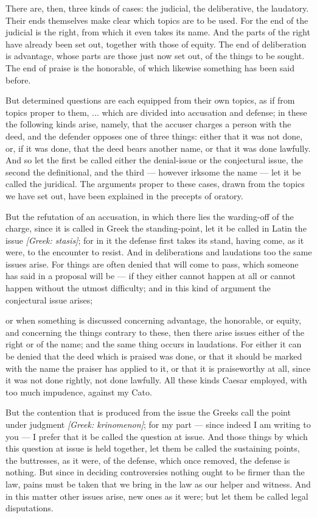  There are, then, three kinds of cases: the judicial, the deliberative, the laudatory. Their ends themselves make clear which topics are to be used. For the end of the judicial is the right, from which it even takes its name. And the parts of the right have already been set out, together with those of equity. The end of deliberation is advantage, whose parts are those just now set out, of the things to be sought. The end of praise is the honorable, of which likewise something has been said before.

 But determined questions are each equipped from their own topics, as if from topics proper to them, ... which are divided into accusation and defense; in these the following kinds arise, namely, that the accuser charges a person with the deed, and the defender opposes one of three things: either that it was not done, or, if it was done, that the deed bears another name, or that it was done lawfully. And so let the first be called either the denial-issue or the conjectural issue, the second the definitional, and the third — however irksome the name — let it be called the juridical. The arguments proper to these cases, drawn from the topics we have set out, have been explained in the precepts of oratory.

 But the refutation of an accusation, in which there lies the warding-off of the charge, since it is called in Greek the standing-point, let it be called in Latin the issue \textit{[Greek: stasis]}; for in it the defense first takes its stand, having come, as it were, to the encounter to resist. And in deliberations and laudations too the same issues arise. For things are often denied that will come to pass, which someone has said in a proposal will be — if they either cannot happen at all or cannot happen without the utmost difficulty; and in this kind of argument the conjectural issue arises;

 or when something is discussed concerning advantage, the honorable, or equity, and concerning the things contrary to these, then there arise issues either of the right or of the name; and the same thing occurs in laudations. For either it can be denied that the deed which is praised was done, or that it should be marked with the name the praiser has applied to it, or that it is praiseworthy at all, since it was not done rightly, not done lawfully. All these kinds Caesar employed, with too much impudence, against my Cato.

 But the contention that is produced from the issue the Greeks call the point under judgment \textit{[Greek: krinomenon]}; for my part — since indeed I am writing to you — I prefer that it be called the question at issue. And those things by which this question at issue is held together, let them be called the sustaining points, the buttresses, as it were, of the defense, which once removed, the defense is nothing. But since in deciding controversies nothing ought to be firmer than the law, pains must be taken that we bring in the law as our helper and witness. And in this matter other issues arise, new ones as it were; but let them be called legal disputations.

